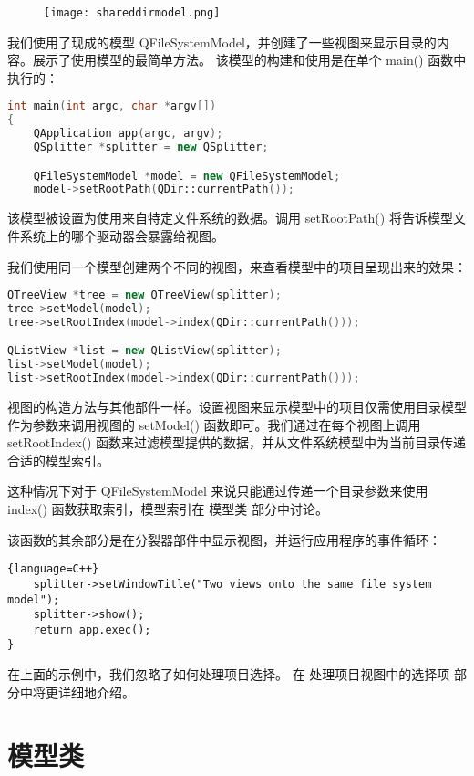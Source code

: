 \begin{figure}[hpt!]  
	\centering
    \texttt{[image: shareddirmodel.png]}
\end{figure}

我们使用了现成的模型 QFileSystemModel，并创建了一些视图来显示目录的内容。展示了使用模型的最简单方法。 该模型的构建和使用是在单个 main() 函数中执行的：

\begin{lstlisting}[language=C++]
int main(int argc, char *argv[])
{
    QApplication app(argc, argv);
    QSplitter *splitter = new QSplitter;

    QFileSystemModel *model = new QFileSystemModel;
    model->setRootPath(QDir::currentPath());
\end{lstlisting}

该模型被设置为使用来自特定文件系统的数据。调用 setRootPath() 将告诉模型文件系统上的哪个驱动器会暴露给视图。

我们使用同一个模型创建两个不同的视图，来查看模型中的项目呈现出来的效果：

\begin{lstlisting}[language=C++]
QTreeView *tree = new QTreeView(splitter);
tree->setModel(model);
tree->setRootIndex(model->index(QDir::currentPath()));

QListView *list = new QListView(splitter);
list->setModel(model);
list->setRootIndex(model->index(QDir::currentPath()));
\end{lstlisting}

视图的构造方法与其他部件一样。设置视图来显示模型中的项目仅需使用目录模型作为参数来调用视图的 setModel() 函数即可。我们通过在每个视图上调用 setRootIndex() 函数来过滤模型提供的数据，并从文件系统模型中为当前目录传递合适的模型索引。

这种情况下对于 QFileSystemModel 来说只能通过传递一个目录参数来使用 index() 函数获取索引，模型索引在 模型类 部分中讨论。

该函数的其余部分是在分裂器部件中显示视图，并运行应用程序的事件循环：

\begin{lstlisting}{language=C++}
    splitter->setWindowTitle("Two views onto the same file system model");
    splitter->show();
    return app.exec();
}
\end{lstlisting}

在上面的示例中，我们忽略了如何处理项目选择。 在 处理项目视图中的选择项 部分中将更详细地介绍。

\section{模型类}

